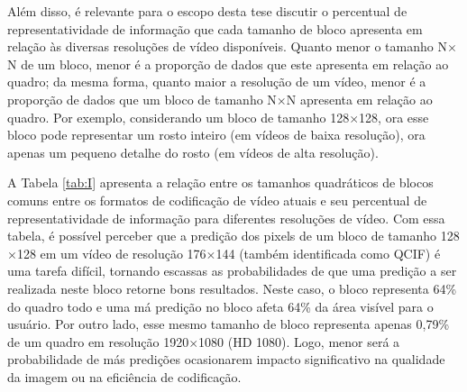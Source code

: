 Além disso, é relevante para o escopo desta tese discutir o percentual de representatividade de informação que cada tamanho de bloco apresenta em relação às diversas resoluções de vídeo disponíveis. Quanto menor o tamanho N$\times$N de um bloco, menor é a proporção de dados que este apresenta em relação ao quadro; da mesma forma, quanto maior a resolução de um vídeo, menor é a proporção de dados que um bloco de tamanho N$\times$N apresenta em relação ao quadro. Por exemplo, considerando um bloco de tamanho 128$\times$128, ora esse bloco pode representar um rosto inteiro (em vídeos de baixa resolução), ora apenas um pequeno detalhe do rosto (em vídeos de alta resolução). 

A Tabela \ref{tab:I} apresenta a relação entre os tamanhos quadráticos de blocos comuns entre os formatos de codificação de vídeo atuais e seu percentual de representatividade de informação para diferentes resoluções de vídeo. Com essa tabela, é possível perceber que a predição dos pixels de um bloco de tamanho 128$\times$128 em um vídeo de resolução 176$\times$144 (também identificada como QCIF) é uma tarefa difícil, tornando escassas as probabilidades de que uma predição a ser realizada neste bloco retorne bons resultados. Neste caso, o bloco representa 64\% do quadro todo e uma má predição no bloco afeta 64\% da área visível para o usuário. Por outro lado, esse mesmo tamanho de bloco representa apenas 0,79\% de um quadro em resolução 1920$\times$1080 (HD 1080). Logo, menor será a probabilidade de más predições ocasionarem impacto significativo na qualidade da imagem ou na eficiência de codificação.








